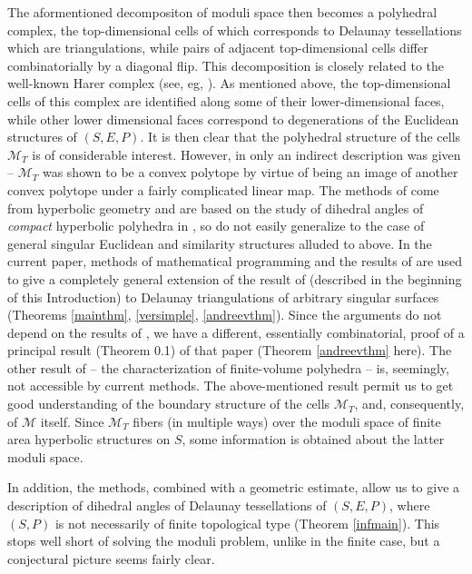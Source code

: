 \documentclass{acmart}
\begin{document}
The aformentioned decompositon of moduli space then becomes a
polyhedral complex, the top-dimensional cells of which corresponds to
Delaunay tessellations 
which are triangulations, while pairs of adjacent top-dimensional
cells differ combinatorially by a diagonal flip. This decomposition is
closely related to the well-known Harer complex (see, eg,
\cite{harer}). As mentioned above, the top-dimensional cells of this
complex are identified along some of their lower-dimensional faces,
while other lower dimensional faces correspond to degenerations of the
Euclidean structures of $(S, E, P)$. It is then clear that the
polyhedral structure of the cells $\mathcal{M}_T$ is of considerable
interest. However, in \cite{rvol} only an indirect description was
given -- $\mathcal{M}_T$ was shown to be a convex polytope by virtue
of being an image of another convex polytope under a fairly
complicated linear map. 
 The methods of \cite{steiner} come from hyperbolic
geometry and are based on the study of dihedral angles of
\emph{compact} hyperbolic polyhedra in \cite{rh}, so do not easily
generalize to the case of general singular Euclidean and similarity
structures alluded to above. In the current paper, 
methods of mathematical programming and the results of
\cite{rvol} are used to give a completely general extension of the
result of \cite{steiner} (described in the beginning of this
Introduction)  to Delaunay triangulations of arbitrary
singular surfaces (Theorems \ref{mainthm}, \ref{versimple},
\ref{andreevthm}). Since the arguments do not depend on the results of
\cite{steiner}, we have a different, essentially
combinatorial, proof of a principal result (Theorem 0.1) of that
paper (Theorem \ref{andreevthm} here). The other result of
\cite{steiner} -- the characterization of finite-volume polyhedra --
is, seemingly, not accessible by current methods. The above-mentioned
result permit us to get good understanding of the boundary structure
of the cells $\mathcal{M}_T$, and, consequently, of $\mathcal{M}$
itself. Since $\mathcal{M}_T$ fibers (in multiple ways) over the
moduli space of finite area hyperbolic structures on $S$, some
information is obtained about the latter moduli space.

In addition, the methods, combined with a geometric estimate, allow us
to give a description of dihedral angles of Delaunay tessellations of
$(S, E, P)$, where $(S, P)$ is not necessarily of finite topological
type (Theorem \ref{infmain}). This stops well short of solving the
moduli problem, unlike in the finite case, but a conjectural picture
seems fairly clear. 
\end{document}
